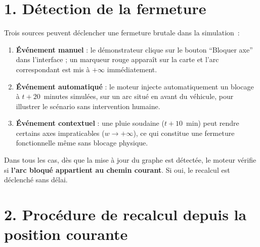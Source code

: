 \documentclass[12pt,a4paper]{article}
\begin{document}
\bigskip

\section*{1. D\'etection de la fermeture}

Trois sources peuvent d\'eclencher une fermeture brutale dans la simulation~:

\begin{enumerate}[leftmargin=1.5em, itemsep=4pt]
  \item \textbf{\'Ev\'enement manuel} : le d\'emonstrateur clique sur le bouton
        ``Bloquer axe'' dans l'interface ; un marqueur rouge appara\^it sur la carte
        et l'arc correspondant est mis \`a $+\infty$ imm\'ediatement.
  \item \textbf{\'Ev\'enement automatiqu\'e} : le moteur injecte automatiquement
        un blocage \`a $t + 20$~minutes simul\'ees, sur un arc situ\'e
        en avant du v\'ehicule, pour illustrer le sc\'enario sans intervention
        humaine.
  \item \textbf{\'Ev\'enement contextuel} : une pluie soudaine ($t + 10$~min)
        peut rendre certains axes impraticables ($w \to +\infty$), ce qui
        constitue une fermeture fonctionnelle m\^eme sans blocage physique.
\end{enumerate}

\noindent
Dans tous les cas, d\`es que la mise \`a jour du graphe est d\'etect\'ee,
le moteur v\'erifie si \textbf{l'arc bloqu\'e appartient au chemin courant}.
Si oui, le recalcul est d\'eclench\'e sans d\'elai.

\bigskip

\section*{2. Proc\'edure de recalcul depuis la position courante}
\end{document}
